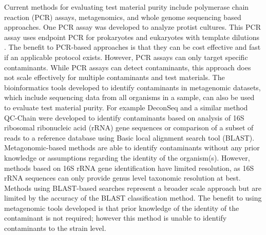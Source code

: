 \documentclass[fleqn,10pt,lineno]{wlpeerj}\usepackage[]{graphicx}\usepackage[]{color}
\begin{document}
Current methods for evaluating test material purity include polymerase chain reaction (PCR) assays, metagenomics, and whole genome sequencing based approaches.  One PCR assay was developed to analyze protist cultures.  This PCR assay uses endpoint PCR for prokaryotes and eukaryotes with template dilutions \citep{Marron2013}.  The benefit to PCR-based approaches is that they can be cost effective and fast if an applicable protocol exists.   However, PCR assays can only target specific contaminants.  While PCR assays can detect contaminants, this approach does not scale effectively for multiple contaminants and test materials. The bioinformatics tools developed to identify contaminants in metagenomic datasets, which include sequencing data from all organisms in a sample, can also be used to evaluate test material purity.  For example DeconSeq \citep{Schmieder2011} and a similar method QC-Chain \citep{Zhou2013} were developed to identify contaminants based on analysis of 16S ribosomal ribonucleic acid (rRNA) gene sequences or comparison of a subset of reads to a reference database using Basic local alignment search tool (BLAST).  Metagonomic-based methods are able to identify contaminants without any prior knowledge or assumptions regarding the identity of the organism(s).  However, methods based on 16S rRNA gene identification have limited resolution, as 16S rRNA sequences can only provide genus level taxonomic resolution at best.  Methods using BLAST-based searches represent a broader scale approach but are limited by the accuracy of the BLAST classification method.   The benefit to using metagenomic tools developed is that prior knowledge of the identity of the contaminant is not required; however this method is unable to identify contaminants to the strain level.   
\end{document}
